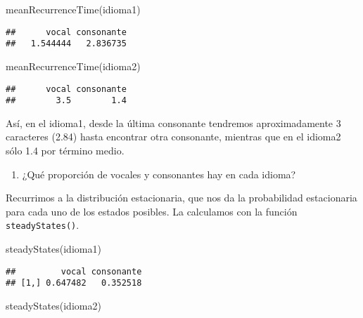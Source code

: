 \documentclass[
]{book}
\newenvironment{Shaded}{\begin{snugshade}}{\end{snugshade}}
\newcommand{\FunctionTok}[1]{\textcolor[rgb]{0.00,0.00,0.00}{#1}}
\newcommand{\NormalTok}[1]{#1}
\providecommand{\tightlist}{%
  \setlength{\itemsep}{0pt}\setlength{\parskip}{0pt}}
\theoremstyle{definition}
\theoremstyle{definition}
\theoremstyle{definition}
\theoremstyle{definition}
\theoremstyle{remark}
\begin{document}
\begin{Shaded}
\begin{Highlighting}[]
\FunctionTok{meanRecurrenceTime}\NormalTok{(idioma1)}
\end{Highlighting}
\end{Shaded}

\begin{verbatim}
##      vocal consonante 
##   1.544444   2.836735
\end{verbatim}

\begin{Shaded}
\begin{Highlighting}[]
\FunctionTok{meanRecurrenceTime}\NormalTok{(idioma2)}
\end{Highlighting}
\end{Shaded}

\begin{verbatim}
##      vocal consonante 
##        3.5        1.4
\end{verbatim}

Así, en el idioma1, desde la última consonante tendremos aproximadamente 3 caracteres (2.84) hasta encontrar otra consonante, mientras que en el idioma2 sólo 1.4 por término medio.

\begin{enumerate}
\def\labelenumi{\arabic{enumi}.}
\setcounter{enumi}{4}
\tightlist
\item
  ¿Qué proporción de vocales y consonantes hay en cada idioma?
\end{enumerate}

Recurrimos a la distribución estacionaria, que nos da la probabilidad estacionaria para cada uno de los estados posibles. La calculamos con la función \texttt{steadyStates()}.

\begin{Shaded}
\begin{Highlighting}[]
\FunctionTok{steadyStates}\NormalTok{(idioma1)}
\end{Highlighting}
\end{Shaded}

\begin{verbatim}
##         vocal consonante
## [1,] 0.647482   0.352518
\end{verbatim}

\begin{Shaded}
\begin{Highlighting}[]
\FunctionTok{steadyStates}\NormalTok{(idioma2)}
\end{Highlighting}
\end{Shaded}
\end{document}
